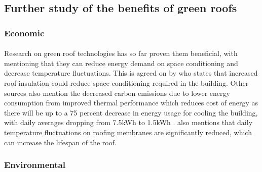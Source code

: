 \documentclass[a4paper]{article}
\begin{document}
\begin{multicols}{2}
  \subsection{Further study of the benefits of green roofs} \label{sec:grben}
  \subsubsection{Economic}
  \paragraph{} Research on green roof technologies has so far proven them
  beneficial, with \cite{energeff} mentioning that they can reduce energy
  demand on space conditioning and decrease temperature fluctuations. This
  is agreed on by \cite{CFGRSG} who states that increased roof insulation
  could reduce space conditioning required in the building. Other
  sources also mention the decreased carbon emissions due to lower energy
  consumption from improved thermal performance \parencite{CommAwareGBSyd}
  which reduces cost of energy as there will be up to a 75 percent
  decrease in energy usage for cooling the building, with daily averages
  dropping from 7.5kWh to 1.5kWh \parencite{energeff}. \cite{energeff} also
  mentions that daily temperature fluctuations on roofing membranes are
  significantly reduced, which can increase the lifespan of the roof.


  \subsubsection{Environmental}

\end{multicols}
\end{document}
